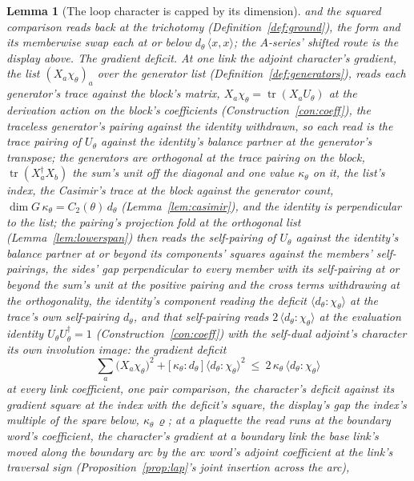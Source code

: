\documentclass[11pt]{article}
\newtheorem{lemma}{Lemma}
\theoremstyle{definition}
\newcommand{\tr}{\operatorname{tr}}
\begin{document}
\begin{lemma}[The loop character is capped by its dimension]
and the squared comparison reads back at the trichotomy
(Definition~\ref{def:ground}), the form and its memberwise swap
each at or below $d_\theta\,\langle x,x\rangle$; the $A$-series'
shifted route is the display above. \emph{The gradient deficit.}
At one link the adjoint character's gradient, the list
$(X_a\chi_\theta)_a$ over the generator list
(Definition~\ref{def:generators}), reads each generator's trace
against the block's matrix, $X_a\chi_\theta=\tr(X_aU_\theta)$ at
the derivation action on the block's coefficients
(Construction~\ref{con:coeff}), the traceless generator's pairing
against the identity withdrawn, so each read is the trace pairing
of $U_\theta$ against the identity's balance partner at the
generator's transpose; the generators are orthogonal at the trace
pairing on the block, $\tr(X_a^{\dagger}X_b)$ the sum's unit off
the diagonal and one value $\kappa_\theta$ on it, the list's
\emph{index}, the Casimir's trace at the block against the
generator count, $\dim G\,\kappa_\theta=C_2(\theta)\,d_\theta$
(Lemma~\ref{lem:casimir}), and the identity is perpendicular to the
list; the pairing's projection fold at the orthogonal list
(Lemma~\ref{lem:lowerspan}) then reads the self-pairing of
$U_\theta$ against the identity's balance partner at or beyond its
components' squares against the members' self-pairings, the sides'
gap perpendicular to every member with its self-pairing at or
beyond the sum's unit at the positive pairing and the cross terms
withdrawing at the orthogonality, the
identity's component reading the deficit
$\langle d_\theta\!:\!\chi_\theta\rangle$ at the trace's own
self-pairing $d_\theta$, and that self-pairing reads
$2\,\langle d_\theta\!:\!\chi_\theta\rangle$ at the evaluation
identity $U_\theta U_\theta^{\dagger}=1$
(Construction~\ref{con:coeff}) with the self-dual adjoint's
character its own involution image: the \emph{gradient deficit}
\[
\sum_a\big(X_a\chi_\theta\big)^2
+\big[\,\kappa_\theta:d_\theta\,\big]\,
\big\langle d_\theta\!:\!\chi_\theta\big\rangle^{2}
\ \le\ 2\,\kappa_\theta\,\big\langle d_\theta\!:\!\chi_\theta\big\rangle
\]
at every link coefficient, one pair comparison, the character's
deficit against its gradient square at the index with the deficit's
square, the display's gap the index's multiple of the spare below,
$\kappa_\theta\,\varrho$; at a plaquette the read runs at the boundary
word's coefficient, the character's gradient at a boundary link the
base link's moved along the boundary arc by the arc word's adjoint
coefficient at the link's traversal sign
(Proposition~\ref{prop:lap}'s joint insertion across the arc),

\end{lemma}
\end{document}
